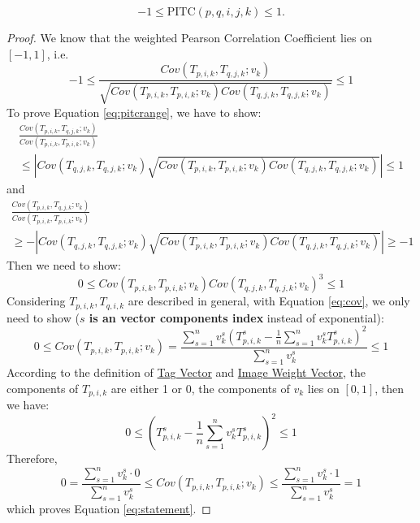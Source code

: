 \begin{lemma}
\label{lemma:pitcrange}
\begin{equation}
\label{eq:pitcrange}
-1 \leq \text{PITC}(p, q, i, j, k) \leq 1.
\end{equation}
\end{lemma}
\begin{proof}
We know that the weighted Pearson Correlation Coefficient \cite{pearson1895note} lies on $[-1, 1]$, i.e.
\[
  -1 \leq \frac{Cov(T_{p,i,k}, T_{q,j,k}; v_k)}{\sqrt{Cov(T_{p,i,k}, T_{p,i,k}; v_k)Cov(T_{q,j,k}, T_{q,j,k}; v_k)}} \leq 1
\]
To prove Equation \ref{eq:pitcrange}, we have to show:
\begin{multline}
  \frac{Cov(T_{p,i,k}, T_{q,j,k}; v_k)}{Cov(T_{p,i,k}, T_{p,i,k}; v_k)} \\
  \leq |Cov(T_{q,j,k}, T_{q,j,k}; v_k)\sqrt{Cov(T_{p,i,k}, T_{p,i,k}; v_k)Cov(T_{q,j,k}, T_{q,j,k}; v_k)}| \leq 1
\end{multline}
and
\begin{multline}
  \frac{Cov(T_{p,i,k}, T_{q,j,k}; v_k)}{Cov(T_{p,i,k}, T_{p,i,k}; v_k)} \\
  \geq -|Cov(T_{q,j,k}, T_{q,j,k}; v_k)\sqrt{Cov(T_{p,i,k}, T_{p,i,k}; v_k)Cov(T_{q,j,k}, T_{q,j,k}; v_k)}| \geq -1
\end{multline}
Then we need to show:
\begin{equation}
0 \leq Cov(T_{p,i,k}, T_{p,i,k}; v_k)Cov(T_{q,j,k}, T_{q,j,k}; v_k)^3 \leq 1
\end{equation}
Considering $T_{p,i,k}, T_{q,i,k}$ are described in general, with Equation \ref{eq:cov}, 
we only need to show (\textbf{$s$ is an vector components index} instead of exponential):
\begin{equation}
\label{eq:statement}
0 \leq Cov(T_{p,i,k}, T_{p,i,k}; v_k) = 
\frac{
  \sum_{s=1}^{n}{
    v_{k}^s
    \left(T_{p,i,k}^s - \frac{1}{n}\sum_{s=1}^{n}{v_{k}^s T_{p,i,k}^s}\right)^2
  }
}{
  \sum_{s=1}^{n}{v_{k}^s}
} \leq 1
\end{equation}
According to the definition of \hyperref[def:tagv]{Tag Vector} and \hyperref[def:weightvk]{Image Weight Vector},
the components of $T_{p,i,k}$ are either 1 or 0, 
the components of $v_k$ lies on $[0, 1]$, then we have:
\begin{equation}
0 \leq \left(T_{p,i,k}^s - \frac{1}{n}\sum_{s=1}^{n}{v_{k}^s T_{p,i,k}^s}\right)^2 \leq 1
\end{equation}
Therefore,
\begin{equation}
0 = \frac{
  \sum_{s=1}^{n}{
    v_{k}^s \cdot 0
  }
}{
  \sum_{s=1}^{n}{v_{k}^s}
} 
\leq Cov(T_{p,i,k}, T_{p,i,k}; v_k) \leq
\frac{
  \sum_{s=1}^{n}{
    v_{k}^s \cdot 1
  }
}{
  \sum_{s=1}^{n}{v_{k}^s}
} = 1
\end{equation}
which proves Equation \ref{eq:statement}.
\end{proof}

